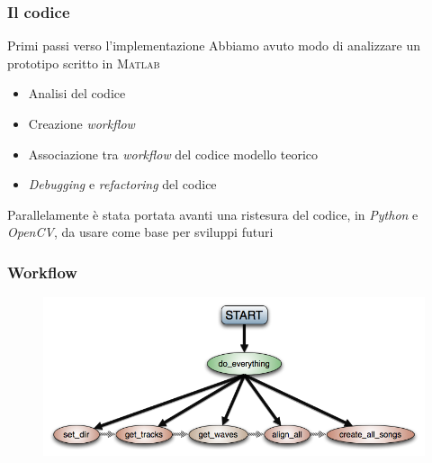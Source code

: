 \begin{frame}
\frametitle{Il codice}
\begin{block}{Primi passi verso l'implementazione}
Abbiamo avuto modo di analizzare un prototipo scritto in \textsc{Matlab}
\end{block}

\begin{block}{}
\begin{itemize}
\item Analisi del codice
\item Creazione \emph{workflow}
\item Associazione tra \emph{workflow} del codice modello teorico
\item \textit{Debugging} e \textit{refactoring} del codice
\end{itemize}
\end{block}

\begin{block}{}
Parallelamente \`e stata portata avanti una ristesura del codice, in \emph{Python}
e \emph{OpenCV}, da usare come base per sviluppi futuri
\end{block}
\end{frame}

\begin{frame}
\frametitle{Workflow}
\begin{figure}
\includegraphics[width=\textwidth]{immagini/workflow.png}
\end{figure}
\end{frame}

